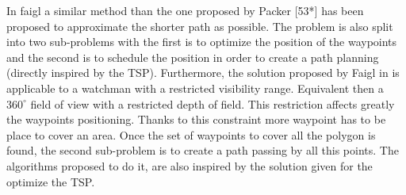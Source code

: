 In faigl  \citep{235*faigl2010}  a similar method than the one proposed by Packer \citep{53*packer2008}[53*] has been proposed to approximate the shorter path as possible. The problem is also split into two sub-problems with the first is to optimize the position of the waypoints and the second is to schedule the position in order to create a path planning (directly inspired by the TSP). 
 Furthermore, the solution proposed by Faigl in \citep{235*faigl2010} is applicable to a watchman with a restricted visibility range. Equivalent then a $360^\circ$ field of view with a restricted depth of field. This restriction affects greatly the waypoints positioning. Thanks to this constraint more waypoint has to be place to cover an area.
 Once the set of waypoints to cover all the polygon is found, the second sub-problem is to create a path passing by all this points.  The algorithms proposed  to do it, are also inspired by the solution given for the optimize the TSP.




